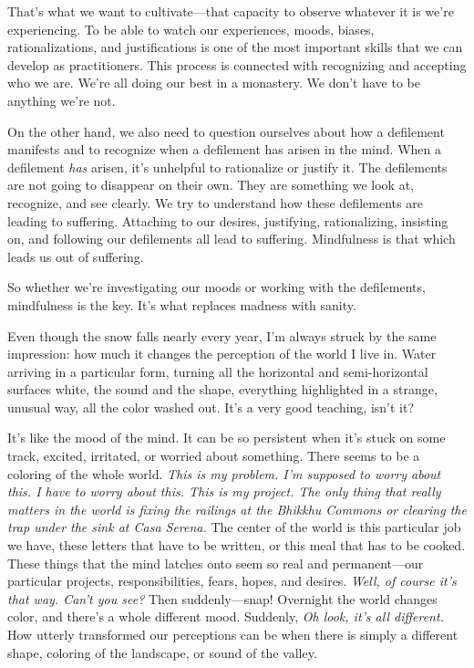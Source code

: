 That's what we want to cultivate---that capacity to observe whatever it
is we're experiencing. To be able to watch our experiences, moods,
biases, rationalizations, and justifications is one of the most
important skills that we can develop as \mbox{practitioners.} This
process is connected with recognizing and accepting who we are. We're
all doing our best in a monastery. We don't have to be anything we're
not.

On the other hand, we also need to question ourselves about how a 
defilement manifests and to recognize when a defilement has arisen in 
the mind. When a defilement \emph{has} arisen, it's unhelpful to 
rationalize or justify it. The defilements are not going to disappear 
on their own. They are something we look at, recognize, and see 
clearly. We try to understand how these defilements are leading to 
suffering. Attaching to our desires, justifying, rationalizing, 
insisting on, and following our defilements all lead to suffering. 
Mindfulness is that which leads us out of suffering.

So whether we're investigating our moods or working with the 
defilements, mindfulness is the key. It's what replaces madness with 
sanity.


Even though the snow falls nearly every year, I'm always struck by the 
same impression: how much it changes the perception of the world I live 
in. Water arriving in a particular form, turning all the horizontal and 
semi-horizontal surfaces white, the sound and the shape, everything 
highlighted in a strange, unusual way, all the color washed out. It's a 
very good teaching, isn't it?

It's like the mood of the mind. It can be so persistent when it's stuck 
on some track, excited, irritated, or worried about something. There 
seems to be a coloring of the whole world. \emph{This is my problem. 
I'm supposed to worry about this. I have to worry about this. This is 
my project. The only thing that really matters in the world is fixing 
the railings at the Bhikkhu Commons or clearing the trap under the sink 
at Casa Serena.} The center of the world is this particular job we 
have, these letters that have to be written, or this meal that has to 
be cooked. These things that the mind latches onto seem so real and 
permanent---our particular projects, responsibilities, fears, hopes, 
and desires. \emph{Well, of course it's that way. Can't you see?} Then 
suddenly---snap! Overnight the world changes color, and there's a whole 
different mood. Suddenly, \emph{Oh look, it's all different.} How 
utterly transformed our perceptions can be when there is simply a 
different shape, coloring of the landscape, or sound of the valley.


